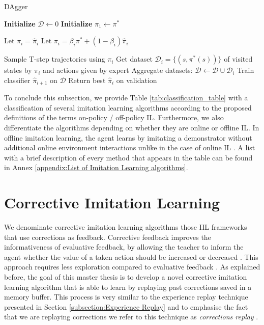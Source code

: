 \begin{algorithm}[H]
\caption{DAgger}
\begin{algorithmic}[1]
\State \textbf{Initialize} $\mathcal{D} \leftarrow 0$ 
\State \textbf{Initialize} $\hat{\pi}_1 \leftarrow \pi^*$ 

\State Let $\pi_i = \hat{\pi}_i$
\EndIf
{}
\State Let $\pi_i = \beta_i\pi^* + (1 -\beta_i)\hat{\pi}_i$
\EndIf


\State Sample T-step trajectories using $\pi_i$
\State Get dataset  $\mathcal{D}_i = \{(s, \pi^*(s))\}$ of visited states by $\pi_i$ and actions given by expert
\State Aggregate datasets:  $\mathcal{D} \leftarrow \mathcal{D} \cup  \mathcal{D}_i$
\State  Train classifier $\hat{\pi}_{i+1}$ on $\mathcal{D}$
\EndFor
\State Return best $\hat{\pi}_i$ on validation
\end{algorithmic}
\label{al:DAgger}
\end{algorithm}


To conclude this subsection, we provide Table \ref{tab:classification_table} with a classification of several imitation learning algorithms according to the proposed definitions of the terms on-policy / off-policy IL. Furthermore, we also differentiate the algorithms depending on whether they are online or offline IL. In offline imitation learning, the agent learns by imitating a demonstrator without additional online environment interactions unlike in the case of online IL \cite{offlineIL}. A list with a brief description of every method that appears in the table can be found in Annex \ref{appendix:List of Imitation Learning algorithms}.






\section{Corrective Imitation Learning}
\label{section:Corrective Imitation Learning}

We denominate corrective imitation learning algorithms those IIL frameworks that use corrections as feedback. Corrective feedback improves the informativeness of evaluative feedback, by allowing the teacher to inform the agent whether the value of a taken action should be increased or decreased \cite{corrections-replay}. This approach requires less exploration compared to evaluative feedback \cite{types-feedback-najar:2020}. As explained before, the goal of this master thesis is to develop a novel corrective imitation learning algorithm that is able to learn by replaying past corrections saved in a memory buffer. This process is very similar to the experience replay technique presented in Section \ref{subsection:Experience Replay} and to emphasise the fact that we are replaying corrections we refer to this technique as \textit{corrections replay} \cite{corrections-replay}.

